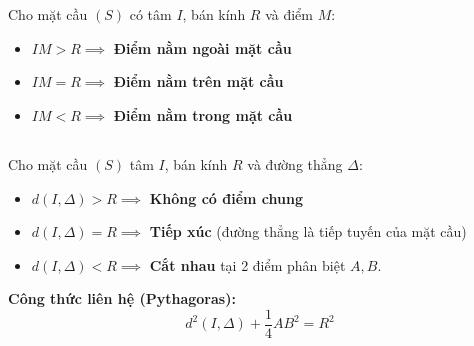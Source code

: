 \documentclass[12pt,a4paper]{extarticle}
\begin{document}
\section*{\color{myblue}{Vị trí tương đối của mặt cầu}}
\subsection*{\color{myblue}{a) Vị trí tương đối giữa điểm và mặt cầu}}
\begin{tcolorbox}[colback=lightblue, colframe=myblue, arc=2mm]
Cho mặt cầu $(S)$ có tâm $I$, bán kính $R$ và điểm $M$:
\begin{itemize}
    \item $IM > R \implies$ \textbf{Điểm nằm ngoài mặt cầu}
    \item $IM = R \implies$ \textbf{Điểm nằm trên mặt cầu}
    \item $IM < R \implies$ \textbf{Điểm nằm trong mặt cầu}
\end{itemize}
\end{tcolorbox}
\vspace{0.3cm}
\subsection*{\color{myblue}{b) Vị trí tương đối giữa đường thẳng và mặt cầu}}
\begin{tcolorbox}[colback=lightblue, colframe=myblue, arc=2mm]
Cho mặt cầu $(S)$ tâm $I$, bán kính $R$ và đường thẳng $\Delta$:
\begin{itemize}
    \item $d(I, \Delta) > R \implies$ \textbf{Không có điểm chung}
    \item $d(I, \Delta) = R \implies$ \textbf{Tiếp xúc} (đường thẳng là tiếp tuyến của mặt cầu)
    \item $d(I, \Delta) < R \implies$ \textbf{Cắt nhau} tại 2 điểm phân biệt $A, B$.
\end{itemize}
\vspace{0.2cm}
\noindent \textbf{Công thức liên hệ (Pythagoras):}
\[
d^2(I, \Delta) + \frac{1}{4} AB^2 = R^2
\]
\end{tcolorbox}
\vspace{0.3cm}
\end{document}

